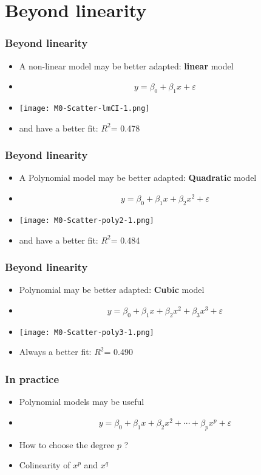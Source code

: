 \documentclass[xcolor=x11names,compress, aspectratio=169]{beamer}
\renewcommand{\(}{\begin{columns}}
\renewcommand{\)}{\end{columns}}
\newcommand{\<}[1]{\begin{column}{#1}}
\renewcommand{\>}{\end{column}}
\begin{document}
\section{Beyond linearity}
\begin{frame} %
\frametitle{Beyond linearity}

\begin{itemize}
 \item A non-linear model may be better adapted: \textbf{linear} model
 \item[]  $$y = \beta_0 + \beta_1 x + \varepsilon$$
 \item[] \texttt{[image: M0-Scatter-lmCI-1.png]}
 \item[] and have a better fit: $R^2$= 0.478
 \end{itemize}
\end{frame}


\begin{frame} %
\frametitle{Beyond linearity}

\begin{itemize}
 \item A Polynomial model may be better adapted: \textbf{Quadratic} model
 \item[]  $$y = \beta_0 + \beta_1 x +  \beta_2 x^2+ \varepsilon$$
 \item[] \texttt{[image: M0-Scatter-poly2-1.png]}
 \item[] and have a better fit: $R^2$= 0.484
 \end{itemize}
\end{frame}

\begin{frame} %
\frametitle{Beyond linearity}

\begin{itemize}
 \item Polynomial may be better adapted: \textbf{Cubic} model
 \item[]  $$y = \beta_0 + \beta_1 x +  \beta_2 x^2 + \beta_3 x^3+ \varepsilon$$
 \item[] \texttt{[image: M0-Scatter-poly3-1.png]}
 \item[] Always a better fit: $R^2$= 0.490
 \end{itemize}
\end{frame}

\begin{frame} %
\frametitle{In practice}

\begin{itemize}[<+->]
 \item Polynomial models may be useful
 \item[]  $$y = \beta_0 + \beta_1 x +  \beta_2 x^2 + \cdots + \beta_p x^p + \varepsilon$$
 \item[] How to choose the degree $p$ ? 
 \item[] Colinearity of $x^p$ and $x^q$
 \end{itemize}
\end{frame}
\end{document}
